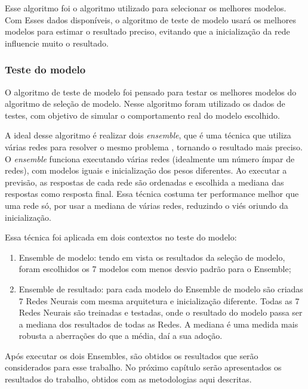 Esse algoritmo foi o algoritmo utilizado para selecionar os melhores modelos. Com Esses dados disponíveis, o algoritmo de teste de modelo usará os melhores modelos para estimar o resultado preciso, evitando que a inicialização da rede influencie muito o resultado.

\subsubsection{Teste do modelo}
\label{sec:meto1}

O algoritmo de teste de modelo foi pensado para testar os melhores modelos do algoritmo de seleção de modelo. Nesse algoritmo foram utilizado os dados de testes, com objetivo de simular o comportamento real do modelo escolhido.

A ideal desse algoritmo é realizar dois \textit{ensemble}, que é uma técnica que utiliza várias redes para resolver o mesmo problema , tornando o resultado mais preciso. O \textit{ensemble} funciona executando várias redes (idealmente um número ímpar de redes), com modelos iguais e inicialização dos pesos diferentes.  Ao executar a previsão, as respostas de cada rede são ordenadas e escolhida a mediana das respostas como resposta final. Essa técnica costuma ter performance melhor que uma rede só, por usar a mediana de várias redes, reduzindo o viés oriundo da inicialização. 

Essa técnica foi aplicada em dois contextos no teste do modelo:

\begin{enumerate}
    \item Ensemble de modelo: tendo em vista os resultados da seleção de modelo, foram escolhidos os 7 modelos com menos desvio padrão para o Ensemble;
    \item Ensemble de resultado: para cada modelo do Ensemble de modelo são criadas 7 Redes Neurais com mesma arquitetura e inicialização diferente. Todas as 7 Redes Neurais são treinadas e testadas, onde o resultado do modelo passa ser a mediana dos resultados de todas as Redes. A mediana é uma medida mais robusta a aberrações do que a média, daí a sua adoção.
\end{enumerate}

Após executar os dois Ensembles, são obtidos os resultados que serão considerados para esse trabalho. No próximo capítulo serão apresentados os resultados do trabalho, obtidos com as metodologias aqui descritas.